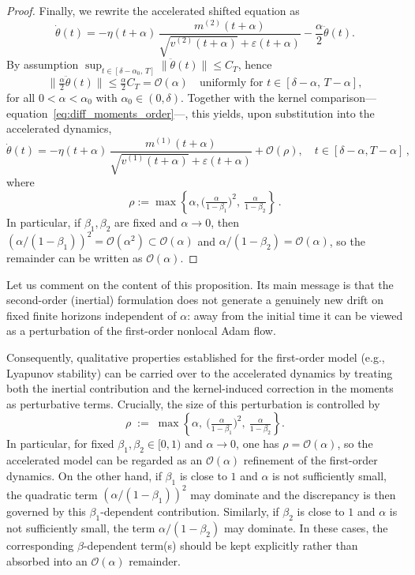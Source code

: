 \documentclass{article} %
\def\eqref#1{equation~\ref{#1}}
\begin{document}
\begin{proof}
Finally, we rewrite the accelerated shifted equation as
\[
\dot\theta(t)
=
-\eta(t+\alpha)\,
\frac{m^{(2)}(t+\alpha)}{\sqrt{v^{(2)}(t+\alpha)}+\varepsilon(t+\alpha)}
-\frac{\alpha}{2}\ddot\theta(t).
\]
By assumption $\sup_{t\in[\delta-\alpha_0,\,T]}\|\ddot\theta(t)\|\le C_T$, hence
\[
\Big\|\tfrac{\alpha}{2}\ddot\theta(t)\Big\|\le \tfrac{\alpha}{2}C_T=\mathcal O(\alpha)
\quad\text{uniformly for }t\in[\delta-\alpha,\,T-\alpha],
\]
for all $0<\alpha<\alpha_0$ with $\alpha_0\in(0,\delta)$. Together with the kernel comparison---\eqref{eq:diff_moments_order}---, this yields, upon substitution into the accelerated dynamics,
\[
\dot\theta(t)=
-\eta(t+\alpha)\,
\frac{m^{(1)}(t+\alpha)}{\sqrt{v^{(1)}(t+\alpha)}+\varepsilon(t+\alpha)}
+\mathcal O(\rho),
\quad t\in[\delta-\alpha,T-\alpha]\,,
\]
where
\[
\rho:=\max\left\{\alpha,\Big(\tfrac{\alpha}{1-\beta_1}\Big)^2,\ \tfrac{\alpha}{1-\beta_2}\right\}\,.
\]
In particular, if $\beta_1,\beta_2$ are fixed and $\alpha\to0$, then $\left(\alpha/(1-\beta_1)\right)^2 = \mathcal O(\alpha^2)\subset \mathcal{O}(\alpha)$ and $\alpha/(1-\beta_2) = \mathcal O(\alpha)$, so the remainder can be written as $\mathcal O(\alpha)$.
\end{proof}

Let us comment on the content of this proposition. Its main message is that the second-order (inertial) formulation does not generate a genuinely new drift on fixed finite horizons independent of $\alpha$: away from the initial time it can be viewed as a perturbation of the first-order nonlocal Adam flow.

Consequently, qualitative properties established for the first-order model (e.g., Lyapunov stability) can be carried over to the accelerated dynamics by treating both the inertial contribution and the kernel-induced correction in the moments as perturbative terms. Crucially, the size of this perturbation is controlled by
\[
\rho \;:=\; \max\left\{\alpha,\ \Big(\tfrac{\alpha}{1-\beta_1}\Big)^2,\ \tfrac{\alpha}{1-\beta_2}\right\}.
\]
In particular, for fixed $\beta_1,\beta_2\in[0,1)$ and $\alpha\to 0$, one has $\rho=\mathcal{O}(\alpha)$, so the accelerated model can be regarded as an $\mathcal{O}(\alpha)$ refinement of the first-order dynamics. On the other hand, if $\beta_1$ is close to $1$ and $\alpha$ is not sufficiently small, the quadratic term $(\alpha/(1-\beta_1))^2$ may dominate and the discrepancy is then governed by this $\beta_1$-dependent contribution. Similarly, if $\beta_2$ is close to $1$ and $\alpha$ is not sufficiently small, the term $\alpha/(1-\beta_2)$ may dominate. In these cases, the corresponding $\beta$-dependent term(s) should be kept explicitly rather than absorbed into an $\mathcal{O}(\alpha)$ remainder.
\end{document}
